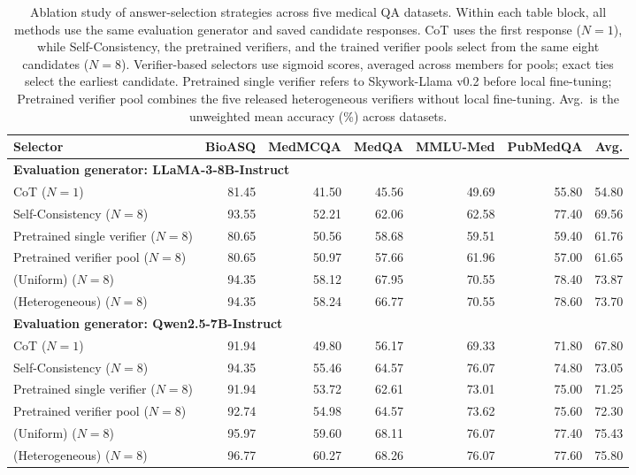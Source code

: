 \begin{table}[!t]
\centering\small
\setlength{\tabcolsep}{4pt}
\begin{tabular}{lrrrrrr}
\toprule
Selector & BioASQ & MedMCQA & MedQA & MMLU-Med & PubMedQA & Avg. \\
\midrule
\multicolumn{7}{l}{\textbf{Evaluation generator: LLaMA-3-8B-Instruct}} \\
CoT ($N=1$) & 81.45 & 41.50 & 45.56 & 49.69 & 55.80 & 54.80 \\
Self-Consistency ($N=8$) & 93.55 & 52.21 & 62.06 & 62.58 & 77.40 & 69.56 \\
Pretrained single verifier ($N=8$) & 80.65 & 50.56 & 58.68 & 59.51 & 59.40 & 61.76 \\
Pretrained verifier pool ($N=8$) & 80.65 & 50.97 & 57.66 & 61.96 & 57.00 & 61.65 \\
\rowcolor{oursrow} \ours{} (Uniform) ($N=8$) & 94.35 & 58.12 & 67.95 & 70.55 & 78.40 & 73.87 \\
\rowcolor{oursrow} \ours{} (Heterogeneous) ($N=8$) & 94.35 & 58.24 & 66.77 & 70.55 & 78.60 & 73.70 \\
\midrule
\multicolumn{7}{l}{\textbf{Evaluation generator: Qwen2.5-7B-Instruct}} \\
CoT ($N=1$) & 91.94 & 49.80 & 56.17 & 69.33 & 71.80 & 67.80 \\
Self-Consistency ($N=8$) & 94.35 & 55.46 & 64.57 & 76.07 & 74.80 & 73.05 \\
Pretrained single verifier ($N=8$) & 91.94 & 53.72 & 62.61 & 73.01 & 75.00 & 71.25 \\
Pretrained verifier pool ($N=8$) & 92.74 & 54.98 & 64.57 & 73.62 & 75.60 & 72.30 \\
\rowcolor{oursrow} \ours{} (Uniform) ($N=8$) & 95.97 & 59.60 & 68.11 & 76.07 & 77.40 & 75.43 \\
\rowcolor{oursrow} \ours{} (Heterogeneous) ($N=8$) & 96.77 & 60.27 & 68.26 & 76.07 & 77.60 & 75.80 \\
\bottomrule
\end{tabular}
\caption{Ablation study of answer-selection strategies across five medical QA datasets. Within each table block, all methods use the same evaluation generator and saved candidate responses. CoT uses the first response ($N=1$), while Self-Consistency, the pretrained verifiers, and the trained verifier pools select from the same eight candidates ($N=8$). Verifier-based selectors use sigmoid scores, averaged across members for pools; exact ties select the earliest candidate. Pretrained single verifier refers to Skywork-Llama v0.2 before local fine-tuning; Pretrained verifier pool combines the five released heterogeneous verifiers without local fine-tuning. Avg.\ is the unweighted mean accuracy (\%) across datasets.}
\label{tab:training_full}
\end{table}
